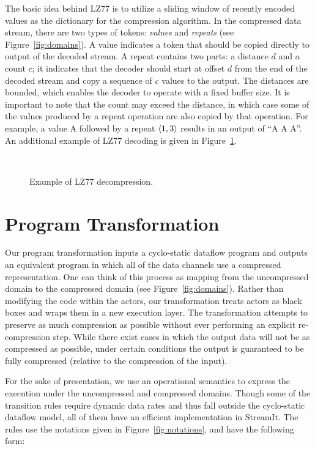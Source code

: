 The basic idea behind LZ77 is to utilize a sliding window of recently
encoded values as the dictionary for the compression algorithm.  In
the compressed data stream, there are two types of tokens: {\it
values} and {\it repeats} (see Figure~\ref{fig:domains}).  A value
indicates a token that should be copied directly to output of the
decoded stream.  A repeat contains two parts: a distance $d$ and a
count $c$; it indicates that the decoder should start at offset $d$
from the end of the decoded stream and copy a sequence of $c$ values
to the output.  The distances are bounded, which enables the decoder
to operate with a fixed buffer size.  It is important to note that the
count may exceed the distance, in which case some of the values
produced by a repeat operation are also copied by that operation.  For
example, a value A followed by a repeat $\langle1, 3\rangle$ results in an
output of ``A A A''.  An additional example of LZ77 decoding is given
in Figure~\ref{fig:lz77}.

\begin{figure}[t]
\begin{minipage}{0.21in}
\mbox{~}
\end{minipage}
\caption{Example of LZ77 decompression.
\protect\label{fig:lz77}}
\end{figure}

\section{Program Transformation}
Our program transformation inputs a cyclo-static dataflow program and
outputs an equivalent program in which all of the data channels use a
compressed representation.  One can think of this process as mapping
from the uncompressed domain to the compressed domain (see
Figure~\ref{fig:domains}).  Rather than modifying the code within the
actors, our transformation treats actors as black boxes and wraps them
in a new execution layer.  The transformation attempts to preserve as
much compression as possible without ever performing an explicit
re-compression step.  While there exist cases in which the output data
will not be as compressed as possible, under certain conditions the
output is guaranteed to be fully compressed (relative to the
compression of the input).

For the sake of presentation, we use an operational semantics to
express the execution under the uncompressed and compressed domains.
Though some of the transition rules require dynamic data rates and
thus fall outside the cyclo-static dataflow model, all of them have an
efficient implementation in StreamIt.  The rules use the notations
given in Figure~\ref{fig:notations}, and have the following form:

